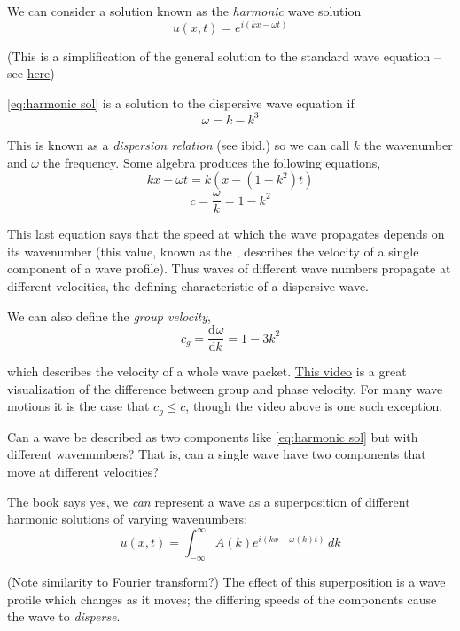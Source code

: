 \documentclass[12pt]{article}
\def\tab{\indent\hspace{15pt}}
\def\D{\mathrm{d}}
\newcommand{\diff}[3][]{\ensuremath{\frac{\D^{#1} #2}{\D #3^{#1}}}}
\begin{document}
We can consider a solution known as the \textit{harmonic} wave solution
\begin{equation}
	u(x, t) = e^{i(kx - \omega t)}
	\label{eq:harmonic sol}
\end{equation}

(This is a simplification of the general solution to the standard wave equation -- see \href{https://github.com/snoopboopsnoop/math-126-notes/blob/main/Physics%20105/Section%208%20notes.pdf}{here})

\tab\eqref{eq:harmonic sol} is a solution to the dispersive wave equation if
\begin{equation}
	\omega = k - k^3
\end{equation}

This is known as a \textit{dispersion relation} (see ibid.) so we can call $k$ the wavenumber and $\omega$ the frequency. Some algebra produces the following equations,
\begin{equation*}
	kx - \omega t = k(x-(1-k^2)t)
\end{equation*}
\begin{equation}
	c = \frac{\omega}{k} = 1 - k^2
\end{equation}

This last equation says that the speed at which the wave propagates depends on its wavenumber (this value, known as the , describes the velocity of a single component of a wave profile). Thus waves of different wave numbers propagate at different velocities, the defining characteristic of a dispersive wave.\medbreak

We can also define the \textit{group velocity},
\begin{equation}
	c_g = \diff{\omega}{k} = 1 - 3k^2
\end{equation}

which describes the velocity of a whole wave packet. \href{https://www.youtube.com/watch?v=tlM9vq-bepA}{This video} is a great visualization of the difference between group and phase velocity. For many wave motions it is the case that $c_g \leq c$, though the video above is one such exception.

\begin{aside}
	Can a wave be described as two components like \eqref{eq:harmonic sol} but with different wavenumbers? That is, can a single wave have two components that move at different velocities?
\end{aside}

The book says yes, we \textit{can} represent a wave as a superposition of different harmonic solutions of varying wavenumbers:
\begin{equation}
	u(x, t) = \int_{-\infty}^{\infty} A(k) e^{i(kx - \omega(k)t)}\, dk
\end{equation}

(Note similarity to Fourier transform?) The effect of this superposition is a wave profile which changes as it moves; the differing speeds of the components cause the wave to \textit{disperse}.
\end{document}
